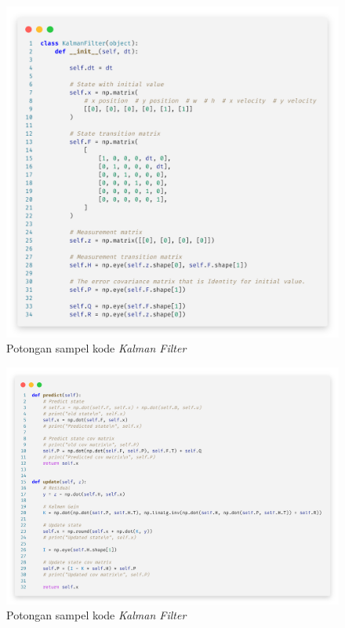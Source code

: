     	\vspace{-0.5cm}
    	\begin{figure}[H]
    		\centering
    		\singlespacing
    		\captionsetup{justification=centering,margin=0.5cm}
    		\includegraphics[width=14.5cm]{image/CodeSnap/kf_01.png}
    		\caption{Potongan sampel kode \textit{Kalman Filter}}
    		\label{fig:code_gmm_morph}
    	\end{figure}
    
	    \vspace{-0.5cm}
	    \begin{figure}[H]
	    	\centering
	    	\singlespacing
	    	\captionsetup{justification=centering,margin=0.5cm}
	    	\includegraphics[width=14.5cm]{image/CodeSnap/kf_02.png}
	    	\caption{Potongan sampel kode \textit{Kalman Filter}}
	    	\label{fig:code_gmm_morph}
	    \end{figure}
			

